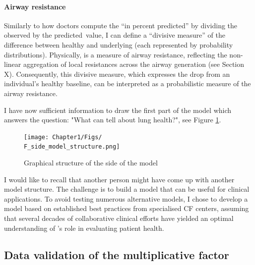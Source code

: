 \paragraph{Airway resistance}
Similarly to how doctors compute the “\F in percent predicted” by dividing the observed \F by the predicted\ value, I can define a “divisive measure” of the difference between healthy and underlying \F (each represented by probability distributions). Physically, \F is a measure of airway resistance, reflecting the non-linear aggregation of local resistances across the airway generation (see Section X). Consequently, this divisive measure, which expresses the drop from an individual's healthy \F baseline, can be interpreted as a probabilistic measure of the airway resistance.

I have now sufficient information to draw the first part of the model which answers the question: "What can \F tell about lung health?", see Figure \ref{graph:\F_side}.

\begin{figure}[!h]
    \caption{Graphical structure of the \F side of the model}
    \centering
    \texttt{[image: Chapter1/Figs/\\F\_side\_model\_structure.png]}
    \label{graph:\F_side}
\end{figure}

I would like to recall that another person might have come up with another model structure. The challenge is to build a model that can be useful for clinical applications. To avoid testing numerous alternative models, I chose to develop a model based on established best practices from specialised CF centers, assuming that several decades of collaborative clinical efforts have yielded an optimal understanding of \F’s role in evaluating patient health.


\subsection{Data validation of the multiplicative factor}

